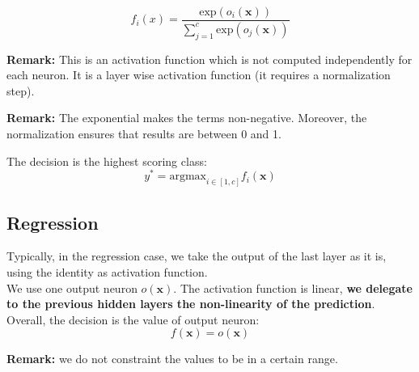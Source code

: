 \begin{equation}
    f_i(x) = \frac{\text{exp}(o_i(\pmb{x}))}{\sum_{j=1}^c \text{exp} (o_j(\pmb{x}))}
\end{equation}

\textbf{Remark:} This is an activation function which is not computed independently for each neuron. It is a layer wise activation function (it requires a normalization step). \newline

\textbf{Remark:} The exponential makes the terms non-negative. Moreover, the normalization ensures that results are between 0 and 1. \newline

The decision is the highest scoring class:
\begin{equation}
    y^* = \text{argmax}_{i \in [1,c]} f_i(\pmb{x})
\end{equation}

\subsection{Regression}
Typically, in the regression case, we take the output of the last layer as it is, using the identity as activation function. \\
We use one output neuron $o(\pmb{x})$. The activation function is linear, \textbf{we delegate to the previous hidden layers the non-linearity of the prediction}. Overall, the decision is the value of output neuron:
\begin{equation}
    f(\pmb{x}) = o(\pmb{x})
\end{equation}

\textbf{Remark:} we do not constraint the values to be in a certain range.

